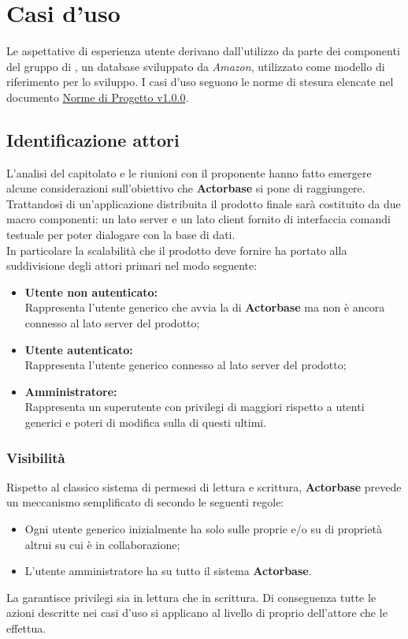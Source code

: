 \documentclass{scalatekids-article}
\begin{document}
\section{Casi d'uso}
Le aspettative di esperienza utente derivano dall'utilizzo da parte dei
componenti del gruppo di , un database 
sviluppato da \textit{Amazon}, utilizzato come modello di riferimento per lo sviluppo. I casi d'uso seguono le norme di stesura elencate nel documento \href{run:../Interni/NormeDiProgetto\_v1.0.0.pdf}{Norme di Progetto v1.0.0}.
\subsection{Identificazione attori}
L'analisi del capitolato e le riunioni con il proponente hanno fatto emergere
alcune considerazioni sull'obiettivo che \textbf{Actorbase} si pone di raggiungere.
Trattandosi di un'applicazione distribuita il prodotto finale sarà costituito
da due macro componenti: un lato server e un lato client fornito di interfaccia
comandi testuale per poter dialogare con la base di dati.\\ In particolare la
scalabilità che il prodotto deve fornire ha portato alla suddivisione degli
attori primari nel modo seguente:\\
\begin{itemize}
\item\textbf{Utente non autenticato:}\\
  Rappresenta l'utente generico che avvia la  di \textbf{Actorbase} ma non è ancora connesso al lato server del prodotto;
\item\textbf{Utente autenticato:}\\
  Rappresenta l'utente generico connesso al lato server del prodotto;
\item\textbf{Amministratore:}\\
  Rappresenta un superutente con privilegi di  maggiori rispetto a utenti generici e poteri di modifica sulla  di questi ultimi.
\end{itemize}
\subsubsection{Visibilità}
Rispetto al classico sistema di permessi di lettura e scrittura, \textbf{Actorbase}
prevede un meccanismo semplificato di  secondo le seguenti regole:
\begin{itemize}
\item Ogni utente generico inizialmente ha  solo sulle proprie  e/o su  di proprietà altrui su cui è in collaborazione;
\item L'utente amministratore ha  su tutto il sistema \textbf{Actorbase}.
\end{itemize}
La  garantisce privilegi sia in lettura che in scrittura. Di
conseguenza tutte le azioni descritte nei casi d'uso si applicano al livello di
 proprio dell'attore che le effettua.
\end{document}
